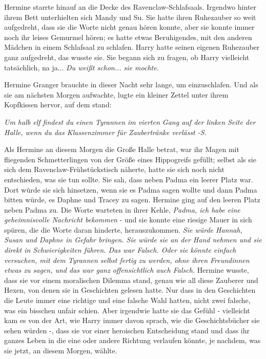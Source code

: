 Hermine starrte hinauf an die Decke des Ravenclaw-Schlafsaals. Irgendwo hinter
ihrem Bett unterhielten sich Mandy und Su. Sie hatte ihren Ruhezauber so weit
aufgedreht, dass sie die Worte nicht genau hören konnte, aber sie konnte immer
noch ihr leises Gemurmel hören; es hatte etwas Beruhigendes, mit den anderen
Mädchen in einem Schlafsaal zu schlafen. Harry hatte seinen eigenen Ruhezauber
ganz aufgedreht, das wusste sie. Sie begann sich zu fragen, ob Harry vielleicht
tatsächlich, na ja... \emph{Du weißt schon... sie mochte.}

Hermine Granger brauchte in dieser Nacht sehr lange, um einzuschlafen. Und als
sie am nächsten Morgen aufwachte, lugte ein kleiner Zettel unter ihrem
Kopfkissen hervor, auf dem stand:

\emph{\glqq{}Um halb elf findest du einen Tyrannen im vierten Gang auf der
linken Seite der Halle, wenn du das Klassenzimmer für Zaubertränke verlässt
-}\emph{S.\grqq{}}

Als Hermine an diesem Morgen die Große Halle betrat, war ihr Magen mit
fliegenden Schmetterlingen von der Größe eines Hippogreifs gefüllt; selbst als
sie sich dem Ravenclaw-Frühstückstisch näherte, hatte sie sich noch nicht
entschieden, was sie tun sollte. Sie sah, dass neben Padma ein leerer Platz war.
Dort würde sie sich hinsetzen, wenn sie es Padma sagen wollte und dann Padma
bitten würde, es Daphne und Tracey zu sagen. Hermine ging auf den leeren Platz
neben Padma zu. Die Worte warteten in ihrer Kehle, \emph{Padma, ich habe eine
geheimnisvolle Nachricht bekommen} - und sie konnte eine riesige Mauer in sich
spüren, die die Worte daran hinderte, herauszukommen. \emph{Sie würde Hannah,
Susan und Daphne in Gefahr bringen. Sie würde sie an der Hand nehmen und sie
direkt in Schwierigkeiten führen. Das war Falsch. Oder sie könnte einfach
versuchen, mit dem Tyrannen selbst fertig zu werden, ohne ihren Freundinnen
etwas zu sagen, und das war ganz offensichtlich auch Falsch.} Hermine wusste,
dass sie vor einem moralischen Dilemma stand, genau wie all diese Zauberer und
Hexen, von denen sie in Geschichten gelesen hatte. Nur dass in den Geschichten
die Leute immer eine richtige und eine falsche Wahl hatten, nicht zwei falsche,
was ein bisschen unfair schien. Aber irgendwie hatte sie das Gefühl - vielleicht
kam es von der Art, wie Harry immer davon sprach, wie die Geschichtsbücher sie
sehen würden -, dass sie vor einer heroischen Entscheidung stand und dass ihr
ganzes Leben in die eine oder andere Richtung verlaufen könnte, je nachdem, was
sie jetzt, an diesem Morgen, wählte.

